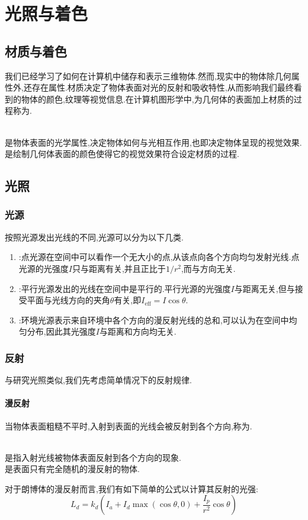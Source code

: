 \documentclass{ctexart}
\begin{document}
\section{光照与着色}
\subsection{材质与着色}
我们已经学习了如何在计算机中储存和表示三维物体.然而,现实中的物体除几何属性外,还存在属性.材质决定了物体表面对光的反射和吸收特性,从而影响我们最终看到的物体的颜色,纹理等视觉信息.在计算机图形学中,为几何体的表面加上材质的过程称为.
\begin{definition}[材质与着色]\\
    是物体表面的光学属性,决定物体如何与光相互作用,也即决定物体呈现的视觉效果.\\
    是绘制几何体表面的颜色使得它的视觉效果符合设定材质的过程.
\end{definition}
\subsection{光照}
\subsubsection{光源}
按照光源发出光线的不同,光源可以分为以下几类.
\begin{enumerate}
    \item {}:点光源在空间中可以看作一个无大小的点,从该点向各个方向均匀发射光线.点光源的光强度$I$只与距离有关,并且正比于$1/r^2$,而与方向无关.
    \item {}:平行光源发出的光线在空间中是平行的.平行光源的光强度$I$与距离无关,但与接受平面与光线方向的夹角$\theta$有关,即$I_{\text{eff}}=I\cos\theta$.
    \item {}:环境光源表示来自环境中各个方向的漫反射光线的总和,可以认为在空间中均匀分布,因此其光强度$I$与距离和方向均无关.
\end{enumerate}
\subsubsection{反射}
与研究光照类似,我们先考虑简单情况下的反射规律.
\paragraph{漫反射}
当物体表面粗糙不平时,入射到表面的光线会被反射到各个方向,称为.
\begin{definition}[漫反射与朗博体]\\
    是指入射光线被物体表面反射到各个方向的现象.\\
    是表面只有完全随机的漫反射的物体.
\end{definition}
对于朗博体的漫反射而言,我们有如下简单的公式以计算其反射的光强:
\[L_d=k_d\left(I_a+I_d\max(\cos\theta,0)+\dfrac{I_p}{r^2}\cos\theta\right)\]
\end{document}
